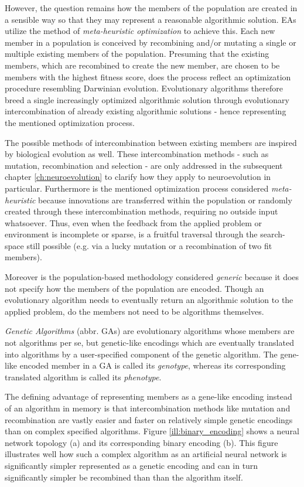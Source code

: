 \documentclass[journal, a4paper]{IEEEtran}
\begin{document}
However, the question remains how the members of the population are created in a sensible way so that they may represent a reasonable algorithmic solution. EAs utilize the method of \textit{meta-heuristic optimization} to achieve this. Each new member in a population is conceived by recombining and/or mutating a single or multiple existing members of the population. Presuming that the existing members, which are recombined to create the new member, are chosen to be members with the highest fitness score, does the process reflect an optimization procedure resembling Darwinian evolution. Evolutionary algorithms therefore breed a single increasingly optimized algorithmic solution through evolutionary intercombination of already existing algorithmic solutions - hence representing the mentioned optimization process. 

The possible methods of intercombination between existing members are inspired by biological evolution as well. These intercombination methods - such as mutation, recombination and selection - are only addressed in the subsequent chapter \ref{ch:neuroevolution} to clarify how they apply to neuroevolution in particular. Furthermore is the mentioned optimization process considered \textit{meta-heuristic} because innovations are transferred within the population or randomly created through these intercombination methods, requiring no outside input whatsoever. Thus, even when the feedback from the applied problem or environment is incomplete or sparse, is a fruitful traversal through the search-space still possible (e.g. via a lucky mutation or a recombination of two fit members).

Moreover is the population-based methodology considered \textit{generic} because it does not specify how the members of the population are encoded. Though an evolutionary algorithm needs to eventually return an algorithmic solution to the applied problem, do the members not need to be algorithms themselves.

\textit{Genetic Algorithms} (abbr. GAs) are evolutionary algorithms whose members are not algorithms per se, but genetic-like encodings which are eventually translated into algorithms by a user-specified component of the genetic algorithm. The gene-like encoded member in a GA is called its \textit{genotype}, whereas its corresponding translated algorithm is called its \textit{phenotype}.

The defining advantage of representing members as a gene-like encoding instead of an algorithm in memory is that intercombination methods like mutation and recombination are vastly easier and faster on relatively simple genetic encodings than on complex specified algorithms. Figure \ref{ill:binary_encoding} shows a neural network topology (a) and its corresponding binary encoding (b). This figure illustrates well how such a complex algorithm as an artificial neural network is significantly simpler represented as a genetic encoding and can in turn significantly simpler be recombined than than the algorithm itself.
\end{document}
